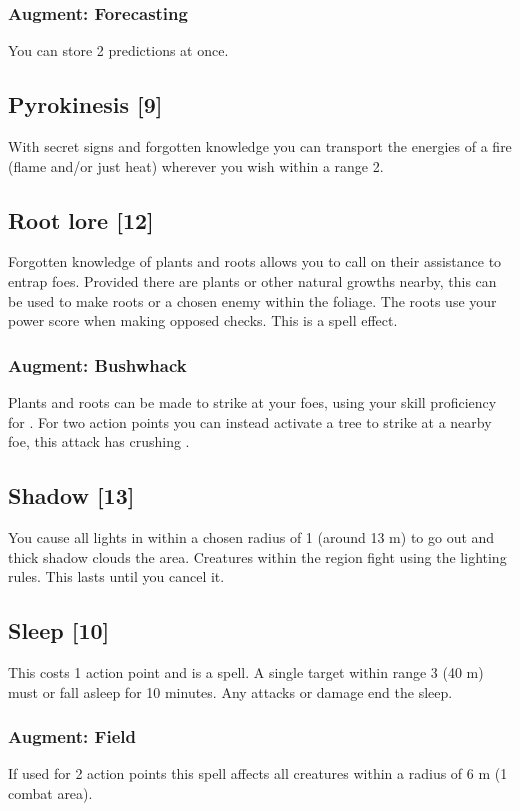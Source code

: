\subsubsection{Augment: Forecasting}
You can store 2 predictions at once.

\subsection{Pyrokinesis [9]}
With secret signs and forgotten knowledge you can transport the energies of a fire (flame and/or just heat) wherever you wish within a range 2. 

\subsection{Root lore [12]}
Forgotten knowledge of plants and roots allows you to call on their assistance to entrap foes. Provided there are plants or other natural growths nearby, this can be used to make roots  or  a chosen enemy within the foliage. The roots use your  power score when making opposed checks. This is a  spell effect.
\subsubsection{Augment: Bushwhack}
Plants and roots can be made to strike at your foes, using your  skill proficiency for . For two action points you can instead activate a tree to strike at a nearby foe, this attack has crushing .

\subsection{Shadow [13]}
You cause all lights in within a chosen radius of 1 (around 13 m) to go out and thick shadow clouds the area. Creatures within the region fight using the  lighting rules. This lasts until you cancel it.

\subsection{Sleep [10]}
This costs 1 action point and is a  spell. A single target within range 3 (40 m) must  or fall asleep for 10 minutes. Any attacks or damage end the sleep. 
\subsubsection{Augment: Field}
If used for 2 action points this spell affects all creatures within a radius of 6 m (1 combat area).

